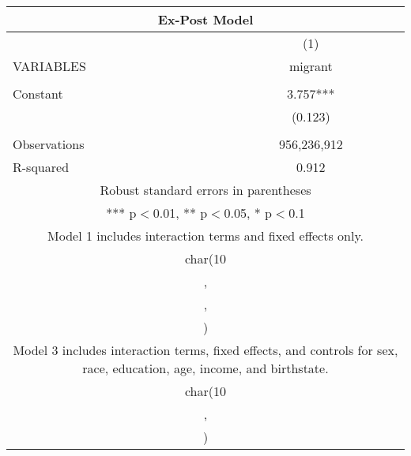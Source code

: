\begin{tabular}{lc}
\multicolumn{2}{c}{Ex-Post Model} \\ \hline
 & (1) \\
VARIABLES & migrant \\ \hline
 &  \\
Constant & 3.757*** \\
 & (0.123) \\
 &  \\
Observations & 956,236,912 \\
 R-squared & 0.912 \\ \hline
\multicolumn{2}{c}{ Robust standard errors in parentheses} \\
\multicolumn{2}{c}{ *** p$<$0.01, ** p$<$0.05, * p$<$0.1} \\
\multicolumn{2}{c}{ Model 1 includes interaction terms and fixed effects only.} \\
\multicolumn{2}{c}{ char(10} \\
\multicolumn{2}{c}{ ,} \\
\multicolumn{2}{c}{ ,} \\
\multicolumn{2}{c}{ )} \\
\multicolumn{2}{c}{ Model 3 includes interaction terms, fixed effects, and controls for sex, race, education, age, income, and birthstate.} \\
\multicolumn{2}{c}{ char(10} \\
\multicolumn{2}{c}{ ,} \\
\multicolumn{2}{c}{ )} \\
\end{tabular}
